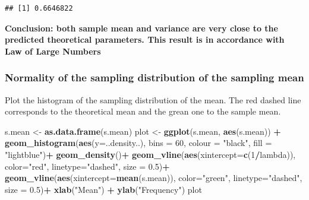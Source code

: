 \documentclass[]{article}
\newenvironment{Shaded}{\begin{snugshade}}{\end{snugshade}}
\newcommand{\DataTypeTok}[1]{\textcolor[rgb]{0.13,0.29,0.53}{#1}}
\newcommand{\DecValTok}[1]{\textcolor[rgb]{0.00,0.00,0.81}{#1}}
\newcommand{\FloatTok}[1]{\textcolor[rgb]{0.00,0.00,0.81}{#1}}
\newcommand{\KeywordTok}[1]{\textcolor[rgb]{0.13,0.29,0.53}{\textbf{#1}}}
\newcommand{\NormalTok}[1]{#1}
\newcommand{\OperatorTok}[1]{\textcolor[rgb]{0.81,0.36,0.00}{\textbf{#1}}}
\newcommand{\StringTok}[1]{\textcolor[rgb]{0.31,0.60,0.02}{#1}}
\begin{document}
\begin{verbatim}
## [1] 0.6646822
\end{verbatim}

\textbf{Conclusion: both sample mean and variance are very close to the
predicted theoretical parameters. This result is in accordance with Law
of Large Numbers}

\hypertarget{normality-of-the-sampling-distribution-of-the-sampling-mean}{%
\subsubsection{Normality of the sampling distribution of the sampling
mean}\label{normality-of-the-sampling-distribution-of-the-sampling-mean}}

Plot the histogram of the sampling distribution of the mean. The red
dashed line corresponds to the theoretical mean and the grean one to the
sample mean.

\begin{Shaded}
\begin{Highlighting}[]
\NormalTok{s.mean <-}\StringTok{ }\KeywordTok{as.data.frame}\NormalTok{(s.mean)}
\NormalTok{plot <-}\StringTok{ }\KeywordTok{ggplot}\NormalTok{(s.mean, }\KeywordTok{aes}\NormalTok{(s.mean)) }\OperatorTok{+}\StringTok{ }
\StringTok{        }\KeywordTok{geom_histogram}\NormalTok{(}\KeywordTok{aes}\NormalTok{(}\DataTypeTok{y=}\NormalTok{..density..), }\DataTypeTok{bins =} \DecValTok{60}\NormalTok{, }
                       \DataTypeTok{colour =} \StringTok{"black"}\NormalTok{, }\DataTypeTok{fill =} \StringTok{"lightblue"}\NormalTok{)}\OperatorTok{+}
\StringTok{        }\KeywordTok{geom_density}\NormalTok{()}\OperatorTok{+}
\StringTok{        }\KeywordTok{geom_vline}\NormalTok{(}\KeywordTok{aes}\NormalTok{(}\DataTypeTok{xintercept=}\KeywordTok{c}\NormalTok{(}\DecValTok{1}\OperatorTok{/}\NormalTok{lambda)),  }
                   \DataTypeTok{color=}\StringTok{"red"}\NormalTok{, }\DataTypeTok{linetype=}\StringTok{"dashed"}\NormalTok{, }
                   \DataTypeTok{size =} \FloatTok{0.5}\NormalTok{)}\OperatorTok{+}\StringTok{ }
\StringTok{        }\KeywordTok{geom_vline}\NormalTok{(}\KeywordTok{aes}\NormalTok{(}\DataTypeTok{xintercept=}\KeywordTok{mean}\NormalTok{(s.mean)),  }
                   \DataTypeTok{color=}\StringTok{"green"}\NormalTok{, }\DataTypeTok{linetype=}\StringTok{"dashed"}\NormalTok{, }
                   \DataTypeTok{size =} \FloatTok{0.5}\NormalTok{)}\OperatorTok{+}\StringTok{ }
\StringTok{        }\KeywordTok{xlab}\NormalTok{(}\StringTok{"Mean"}\NormalTok{) }\OperatorTok{+}\StringTok{ }\KeywordTok{ylab}\NormalTok{(}\StringTok{"Frequency"}\NormalTok{)}
\NormalTok{plot}
\end{Highlighting}
\end{Shaded}
\end{document}
